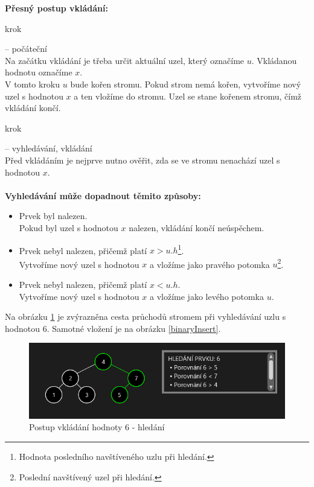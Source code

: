 \documentclass[
  biblatex=false,
  font=serif,
  glossaries=false,
  tables=false,
  theorems=false,
  index
]{kidiplom}
\makeatletter
\newcommand\footnoteref[1]{\protected@xdef\@thefnmark{\ref{#1}}\@footnotemark}
\makeatother
\begin{document}
\noindent \textbf{Přesný postup vkládání:}
\begin{enumerate} {\bfseries
\item  krok} -- počáteční \\
Na začátku vkládání je třeba určit aktuální uzel, který označíme $u$. Vkládanou hodnotu označíme $x$.\\
V tomto kroku $u$ bude kořen stromu. Pokud strom nemá kořen, vytvoříme nový uzel s hodnotou $x$ a ten vložíme do stromu. Uzel se stane kořenem stromu, čímž vkládání končí.
{\bfseries\item  krok} -- vyhledávání, vkládání \\
Před vkládáním je nejprve nutno ověřit, zda se ve stromu nenachází uzel s hodnotou $x$.\\\\
\textbf{Vyhledávání může dopadnout těmito způsoby:}
\begin{itemize}
\item Prvek byl nalezen. \\
Pokud byl uzel s hodnotou $x$ nalezen, vkládání končí neúspěchem.
\item Prvek nebyl nalezen, přičemž platí $x > u.h$\footnote{\label{hodnotaPosledniho}Hodnota posledního navštíveného uzlu při hledání.}.\\
Vytvoříme nový uzel s hodnotou $x$ a vložíme jako pravého potomka $u$\footnote{\label{posledni}Poslední navštívený uzel při hledání.}.
\item Prvek nebyl nalezen, přičemž platí $x < u.h$\footnoteref{hodnotaPosledniho}.\\
Vytvoříme nový uzel s hodnotou $x$ a vložíme jako levého potomka $u$\footnoteref{posledni}.
\end{itemize}
\end{enumerate}

\medskip
\noindent Na obrázku \ref{binarySearchInsert} je zvýrazněna cesta průchodů stromem při vyhledávání uzlu s hodnotou 6. Samotné vložení je na obrázku \ref{binaryInsert}.

\begin{figure}[h!]
\centering
	\includegraphics[scale=0.9]{obrazky/6BinarniVkladani1.png}
	\caption{Postup vkládání hodnoty 6 - hledání}
	\label{binarySearchInsert}
\end{figure}
\end{document}
